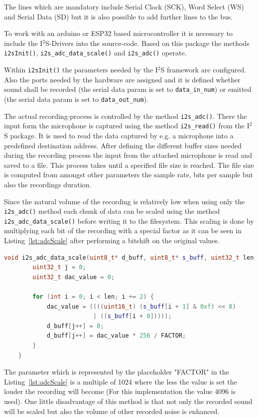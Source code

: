 The lines which are mandatory include Serial Clock (SCK), Word Select (WS) and Serial Data (SD) but it is also possible to add further lines to the bus.  

To work with an arduino or ESP32 based microcontroller it is necessary to include the I$^2$S-Drivers into the source-code.
Based on this package the methods\texttt{ i2sInit()}, \texttt{i2s\_adc\_data\_scale()} and \texttt{i2s\_adc()} operate.

Within \texttt{i2sInit()} the parameters needed by the I$^2$S framework are configured.
Also the ports needed by the hardware are assigned and it is defined whether sound shall be recorded (the serial data param is set to \texttt{data\_in\_num}) or emitted (the serial data param is set to \texttt{data\_out\_num}).

The actual recording-process is controlled by the method \texttt{i2s\_adc()}.
There the input form the microphone is captured using the method \texttt{i2s\_read()} from the I$^2$S package.
It is used to read the data captured by e.g. a microphone into a predefined destination address.
After defining the different buffer sizes needed during the recording process the input from the attached microphone is read and saved to a file.
This process takes until a specified file size is reached.
The file size is computed from amongst other parameters the sample rate, bits per sample but also the recordings duration.  

Since the natural volume of the recording is relatively low when using only the \texttt{i2s\_adc()} method each chunk of data can be scaled using the method \texttt{i2s\_adc\_data\_scale()} before writing it to the filesystem.
This scaling is done by multiplying each bit of the recording with a special factor as it can be seen in Listing~\ref{lst:adcScale} after performing a bitshift on the original values.
\begin{lstlisting}[frame=single, language={c++}, style=style,
	caption={The function which is used to scale the captured recordings volume.}, label={lst:adcScale},float=!htb]	
	void i2s_adc_data_scale(uint8_t* d_buff, uint8_t* s_buff, uint32_t len) {
		uint32_t j = 0;
		uint32_t dac_value = 0;
		
		for (int i = 0; i < len; i += 2) {
			dac_value = ((((uint16_t) (s_buff[i + 1] & 0xf) << 8)
						 | ((s_buff[i + 0]))));
			d_buff[j++] = 0;
			d_buff[j++] = dac_value * 256 / FACTOR;
		}
	}	
\end{lstlisting}
The parameter which is represented by the placeholder "FACTOR" in the Listing~\ref{lst:adcScale} is a multiple of 1024 where the less the value is set the louder the recording will become (For this implementation the value 4096 is used).
One little disadvantage of this method is that not only the recorded sound will be scaled but also the volume of other recorded noise is enhanced.

